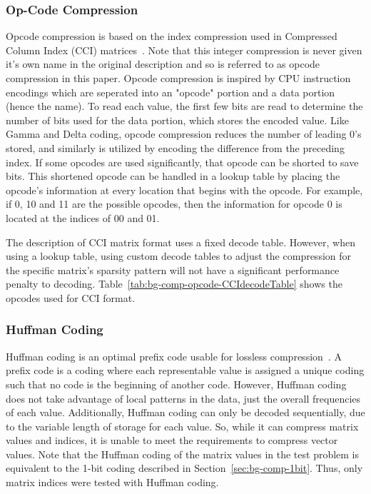 \subsubsection{Op-Code Compression}
Opcode compression is based on the index compression used in Compressed Column Index (CCI) matrices~\cite{Lawlor:2013:compression}.
Note that this integer compression is never given it's own name in the original description and so is referred to as opcode compression in this paper.
Opcode compression is inspired by CPU instruction encodings which are seperated into an "opcode" portion and a data portion (hence the name).
To read each value, the first few bits are read to determine the number of bits used for the data portion, which stores the encoded value.
Like Gamma and Delta coding, opcode compression reduces the number of leading 0's stored, and similarly is utilized by encoding the difference from the preceding index.
If some opcodes are used significantly, that opcode can be shorted to save bits.
This shortened opcode can be handled in a lookup table by placing the opcode's information at every location that begins with the opcode.
For example, if 0, 10 and 11 are the possible opcodes, then the information for opcode 0 is located at the indices of 00 and 01.

The description of CCI matrix format uses a fixed decode table.
However, when using a lookup table, using custom decode tables to adjust the compression for the specific matrix's sparsity pattern will not have a significant performance penalty to decoding.
Table~\ref{tab:bg-comp-opcode-CCIdecodeTable} shows the opcodes used for CCI format.



\subsubsection{Huffman Coding}
\label{sec:bg-comp-huffman}
Huffman coding is an optimal prefix code usable for lossless compression~\cite{Huffman:1952:coding}.
A prefix code is a coding where each representable value is assigned a unique coding such that no code is the beginning of another code.
However, Huffman coding does not take advantage of local patterns in the data, just the overall frequencies of each value.
Additionally, Huffman coding can only be decoded sequentially, due to the variable length of storage for each value.
So, while it can compress matrix values and indices, it is unable to meet the requirements to compress vector values.
Note that the Huffman coding of the matrix values in the test problem is equivalent to the 1-bit coding described in Section~\ref{sec:bg-comp-1bit}.
Thus, only matrix indices were tested with Huffman coding.

